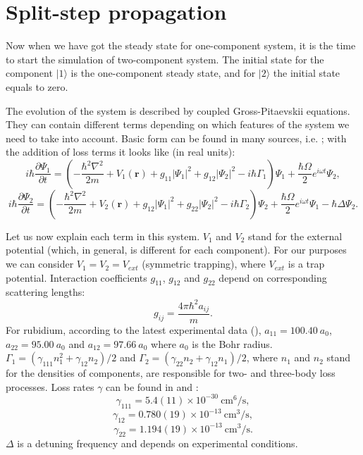 \documentclass[12pt,notitlepage]{report}
\begin{document}
\section*{Split-step propagation}

Now when we have got the steady state for one-component system, it is the time to start the simulation of two-component system. The initial state for the component $\vert1\rangle$ is the one-component steady state, and for $\vert2\rangle$ the initial state equals to zero.

The evolution of the system is described by coupled Gross-Pitaevskii equations. They can contain different terms depending on which features of the system we need to take into account. Basic form can be found in many sources, i.e. \cite{pitaevskii_bec}; with the addition of loss terms it looks like (in real units):
\[ i \hbar \frac{\partial \Psi_1}{\partial t} = \left(
	-\frac{\hbar^2\nabla^2}{2m} + V_1(\mathbf{r}) +
	g_{11} \vert \Psi_1 \vert^2 + g_{12} \vert \Psi_2 \vert^2 - i \hbar \Gamma_1
\right) \Psi_1 + \frac{\hbar \Omega}{2}e^{i \omega t} \Psi_2, \]
\[ i \hbar \frac{\partial \Psi_2}{\partial t} = \left(
	-\frac{\hbar^2\nabla^2}{2m} + V_2(\mathbf{r}) +
	g_{12} \vert \Psi_1 \vert^2 + g_{22} \vert \Psi_2 \vert^2 - i \hbar \Gamma_2
\right) \Psi_2 + \frac{\hbar \Omega}{2}e^{i \omega t} \Psi_1 - \hbar \Delta \Psi_2. \]

Let us now explain each term in this system. $V_1$ and $V_2$ stand for the external potential (which, in general, is different for each component). For our purposes we can consider $V_1 = V_2 = V_{ext}$ (symmetric trapping), where $V_{ext}$ is a trap potential. Interaction coefficients $g_{11}$, $g_{12}$ and $g_{22}$ depend on corresponding scattering lengths:
\[ g_{ij} = \frac{4 \pi \hbar^2 a_{ij}}{m}. \]
For rubidium, according to the latest experimental data (\cite{PhysRevLett.99.190402}), $a_{11} = 100.40\ a_0$, $a_{22} = 95.00\ a_0$ and $a_{12} = 97.66\ a_0$ where $a_0$ is the Bohr radius. $\Gamma_1 = (\gamma_{111} n_1^2 + \gamma_{12} n_2) / 2$ and $\Gamma_2 = (\gamma_{22} n_2 + \gamma_{12} n_1) / 2$, where $n_1$ and $n_2$ stand for the densities of components, are responsible for two- and three-body loss processes. Loss rates $\gamma$ can be found in \cite{PhysRevLett.99.190402} and \cite{PhysRevLett.79.337}:
\[ \gamma_{111} = 5.4(11) \times 10^{-30}\ \textrm{cm}^6/\textrm{s}, \]
\[ \gamma_{12} = 0.780(19) \times 10^{-13}\ \textrm{cm}^3/\textrm{s}, \]
\[ \gamma_{22} = 1.194(19) \times 10^{-13}\ \textrm{cm}^3/\textrm{s}. \]
$\Delta$ is a detuning frequency and depends on experimental conditions.
\end{document}
